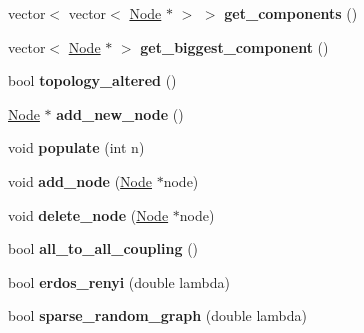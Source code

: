 \begin{DoxyCompactItemize}
\item 
\hypertarget{classNetwork_aaa803fd081ed5f24a38c981055fd459d}{}vector$<$ vector$<$ \hyperlink{classNode}{Node} $\ast$ $>$ $>$ {\bfseries get\+\_\+components} ()\label{classNetwork_aaa803fd081ed5f24a38c981055fd459d}

\item 
\hypertarget{classNetwork_aad3d529c979cefd275f1c72c51aedff8}{}vector$<$ \hyperlink{classNode}{Node} $\ast$ $>$ {\bfseries get\+\_\+biggest\+\_\+component} ()\label{classNetwork_aad3d529c979cefd275f1c72c51aedff8}

\item 
\hypertarget{classNetwork_aac7db1edc83f6ee1811545504d391944}{}bool {\bfseries topology\+\_\+altered} ()\label{classNetwork_aac7db1edc83f6ee1811545504d391944}

\item 
\hypertarget{classNetwork_a18f85b48490f70707eb0d3ecf3af3bb7}{}\hyperlink{classNode}{Node} $\ast$ {\bfseries add\+\_\+new\+\_\+node} ()\label{classNetwork_a18f85b48490f70707eb0d3ecf3af3bb7}

\item 
\hypertarget{classNetwork_a43c10781b1a8cd9d1d45631524619e12}{}void {\bfseries populate} (int n)\label{classNetwork_a43c10781b1a8cd9d1d45631524619e12}

\item 
\hypertarget{classNetwork_aaf0e1975514749d95d7e3baeb931c176}{}void {\bfseries add\+\_\+node} (\hyperlink{classNode}{Node} $\ast$node)\label{classNetwork_aaf0e1975514749d95d7e3baeb931c176}

\item 
\hypertarget{classNetwork_afa5ba9cc04dd16835794edc3a9069f73}{}void {\bfseries delete\+\_\+node} (\hyperlink{classNode}{Node} $\ast$node)\label{classNetwork_afa5ba9cc04dd16835794edc3a9069f73}

\item 
\hypertarget{classNetwork_a3b1aed2ba4355e1b6429afc43105632e}{}bool {\bfseries all\+\_\+to\+\_\+all\+\_\+coupling} ()\label{classNetwork_a3b1aed2ba4355e1b6429afc43105632e}

\item 
\hypertarget{classNetwork_a1bc00a48e15b686922ea929d2d9cfef9}{}bool {\bfseries erdos\+\_\+renyi} (double lambda)\label{classNetwork_a1bc00a48e15b686922ea929d2d9cfef9}

\item 
\hypertarget{classNetwork_aeb3c4bdf9689a323e124c05f7829798f}{}bool {\bfseries sparse\+\_\+random\+\_\+graph} (double lambda)\label{classNetwork_aeb3c4bdf9689a323e124c05f7829798f}


\end{DoxyCompactItemize}

